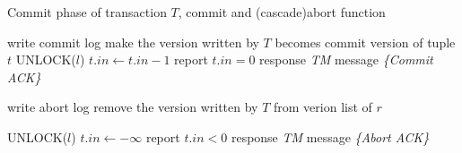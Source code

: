 \documentclass[conference]{IEEEtran}
\begin{document}
\begin{algorithm}[!h]
  \caption{Commit phase of transaction ${T}$, commit and (cascade)abort function}
  \begin{algorithmic}[1]
    \State write commit log
      \State make the version written by ${T}$ becomes commit version of tuple ${t}$ 
    \EndFor
      \State UNLOCK(${l}$)
    \EndFor
      \State ${t.in \gets t.in - 1}$ 
        \State report ${t.in = 0}$ 
      \EndIf
    \EndFor
    \State response \emph{TM} message \emph{\{Commit ACK\}}
    \label{func:commit}
  \EndFunction
  \end{algorithmic}
  \begin{algorithmic}[1]
  \State write abort log
    \State remove the version written by ${T}$ from verion list of ${r}$
\EndFor

      \State UNLOCK(${l}$)
    \EndFor
      \State ${t.in \gets -\infty }$
      \State report ${t.in < 0}$ 
    \EndFor
    \State response \emph{TM} message \emph{\{Abort ACK\}}
    \label{func:abort}
  \EndFunction
  \end{algorithmic}

  \label{alg:commit_phase}
\end{algorithm}
\end{document}
